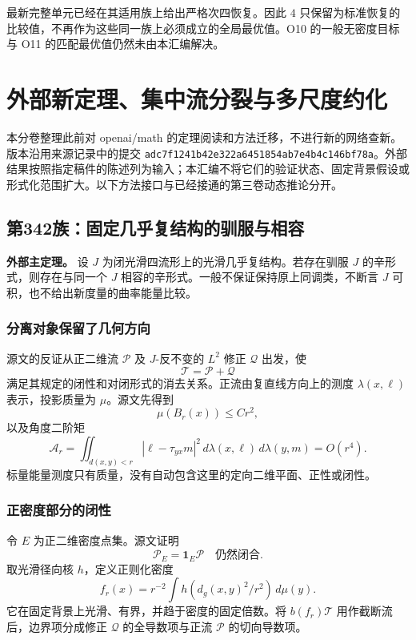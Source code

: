 \documentclass[UTF8,11pt,openany,fontset=none]{ctexbook}
\theoremstyle{definition}
\theoremstyle{remark}
\begin{document}
最新完整单元已经在其适用族上给出严格次四恢复。因此 \(4\) 只保留为标准恢复的比较值，不再作为这些同一族上必须成立的全局最优值。O10 的一般无密度目标与 O11 的匹配最优值仍然未由本汇编解决。\cite{B01,R03,R04}


\chapter{外部新定理、集中流分裂与多尺度约化}
本分卷整理此前对 openai/math 的定理阅读和方法迁移，不进行新的网络查新。版本沿用来源记录中的提交 \texttt{adc7f1241b42e322a6451854ab7e4b4c146bf78a}。外部结果按照指定稿件的陈述列为输入；本汇编不将它们的验证状态、固定背景假设或形式化范围扩大。以下方法接口与已经接通的第三卷动态推论分开。\cite{R01,R02}

\section{第342族：固定几乎复结构的驯服与相容}\label{v2-ux7b2c342ux65cfux56faux5b9aux51e0ux4e4eux590dux7ed3ux6784ux7684ux9a6fux670dux4e0eux76f8ux5bb9}

\textbf{外部主定理。} 设 \(J\) 为闭光滑四流形上的光滑几乎复结构。若存在驯服 \(J\) 的辛形式，则存在与同一个 \(J\) 相容的辛形式。一般不保证保持原上同调类，不断言 \(J\) 可积，也不给出新度量的曲率能量比较。\cite{OAI342}

\subsection{分离对象保留了几何方向}\label{v2-ux5206ux79bbux5bf9ux8c61ux4fddux7559ux4e86ux51e0ux4f55ux65b9ux5411}

源文的反证从正二维流 \(\mathscr P\) 及 \(J\)-反不变的 \(L^2\) 修正 \(\mathscr Q\) 出发，使 \[
 \mathscr T=\mathscr P+\mathscr Q
\] 满足其规定的闭性和对闭形式的消去关系。正流由复直线方向上的测度 \(\lambda(x,\ell)\) 表示，投影质量为 \(\mu\)。源文先得到 \[
 \mu(B_r(x))\le Cr^2,
\] 以及角度二阶矩 \[
 \mathcal A_r=
 \iint_{d(x,y)<r}|\ell-\tau_{yx}m|^2\,
 d\lambda(x,\ell)\,d\lambda(y,m)=O(r^4).
\tag{2.1}
\] 标量能量测度只有质量，没有自动包含这里的定向二维平面、正性或闭性。

\subsection{正密度部分的闭性}\label{v2-ux6b63ux5bc6ux5ea6ux90e8ux5206ux7684ux95edux6027}

令 \(E\) 为正二维密度点集。源文证明 \[
 \boxed{\mathscr P_E=\mathbf1_E\mathscr P\quad\text{仍然闭合}.}
\tag{2.2}
\] 取光滑径向核 \(h\)，定义正则化密度 \[
 f_r(x)=r^{-2}\int h(d_g(x,y)^2/r^2)\,d\mu(y).
\] 它在固定背景上光滑、有界，并趋于密度的固定倍数。将 \(b(f_r)\mathscr T\) 用作截断流后，边界项分成修正 \(\mathscr Q\) 的全导数项与正流 \(\mathscr P\) 的切向导数项。
\end{document}
